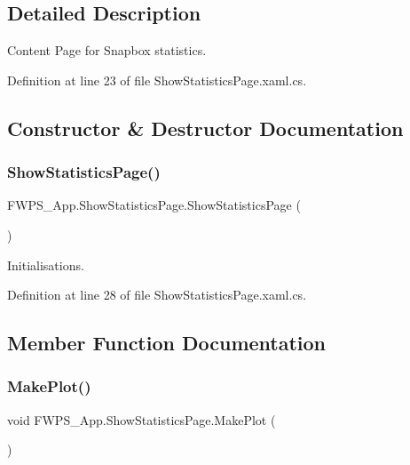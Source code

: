 \subsection{Detailed Description}
Content Page for Snapbox statistics. 

Definition at line 23 of file Show\+Statistics\+Page.\+xaml.\+cs.



\subsection{Constructor \& Destructor Documentation}
\mbox{\label{class_f_w_p_s___app_1_1_show_statistics_page_ae76ab46b70af80f5f1599bac9851512f}} 
\subsubsection{\texorpdfstring{Show\+Statistics\+Page()}{ShowStatisticsPage()}}
{\footnotesize\ttfamily F\+W\+P\+S\+\_\+\+App.\+Show\+Statistics\+Page.\+Show\+Statistics\+Page (\begin{DoxyParamCaption}{ }\end{DoxyParamCaption})}



Initialisations. 



Definition at line 28 of file Show\+Statistics\+Page.\+xaml.\+cs.



\subsection{Member Function Documentation}
\mbox{\label{class_f_w_p_s___app_1_1_show_statistics_page_a1028ff86cc7512a4965b6f69ce5bfc0d}} 
\subsubsection{\texorpdfstring{Make\+Plot()}{MakePlot()}}
{\footnotesize\ttfamily void F\+W\+P\+S\+\_\+\+App.\+Show\+Statistics\+Page.\+Make\+Plot (\begin{DoxyParamCaption}{ }\end{DoxyParamCaption})}

